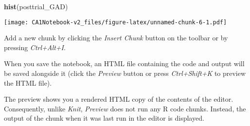 \documentclass[
]{article}
\newenvironment{Shaded}{\begin{snugshade}}{\end{snugshade}}
\newcommand{\FunctionTok}[1]{\textcolor[rgb]{0.13,0.29,0.53}{\textbf{#1}}}
\newcommand{\NormalTok}[1]{#1}
\begin{document}
\begin{Shaded}
\begin{Highlighting}[]
\FunctionTok{hist}\NormalTok{(posttrial\_GAD)}
\end{Highlighting}
\end{Shaded}

\texttt{[image: CA1Notebook-v2\_files/figure-latex/unnamed-chunk-6-1.pdf]}

Add a new chunk by clicking the \emph{Insert Chunk} button on the
toolbar or by pressing \emph{Ctrl+Alt+I}.

When you save the notebook, an HTML file containing the code and output
will be saved alongside it (click the \emph{Preview} button or press
\emph{Ctrl+Shift+K} to preview the HTML file).

The preview shows you a rendered HTML copy of the contents of the
editor. Consequently, unlike \emph{Knit}, \emph{Preview} does not run
any R code chunks. Instead, the output of the chunk when it was last run
in the editor is displayed.
\end{document}
